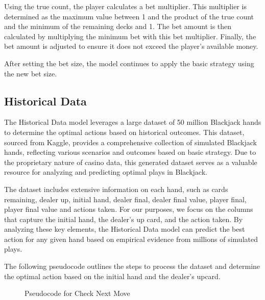 \documentclass[a4paper,12pt]{report}
\begin{document}
Using the true count, the player calculates a bet multiplier. This multiplier is determined as the maximum value between 1 and the product of the true count and the minimum of the remaining decks and 1. The bet amount is then calculated by multiplying the minimum bet with this bet multiplier. Finally, the bet amount is adjusted to ensure it does not exceed the player's available money.

After setting the bet size, the model continues to apply the basic strategy using the new bet size.

\subsection{Historical Data}
The Historical Data model leverages a large dataset of 50 million Blackjack hands \cite{url:1} to determine the optimal actions based on historical outcomes. This dataset, sourced from Kaggle, provides a comprehensive collection of simulated Blackjack hands, reflecting various scenarios and outcomes based on basic strategy. Due to the proprietary nature of casino data, this generated dataset serves as a valuable resource for analyzing and predicting optimal plays in Blackjack.

The dataset includes extensive information on each hand, such as cards remaining, dealer up, initial hand, dealer final, dealer final value, player final, player final value and actions taken. For our purposes, we focus on the columns that capture the initial hand, the dealer's up card, and the action taken. By analyzing these key elements, the Historical Data model can predict the best action for any given hand based on empirical evidence from millions of simulated plays.

The following pseudocode outlines the steps to process the dataset and determine the optimal action based on the initial hand and the dealer's upcard.

\begin{figure}[H]
\caption{Pseudocode for Check Next Move}
\label{alg:historical_data}
\end{figure}
\end{document}
